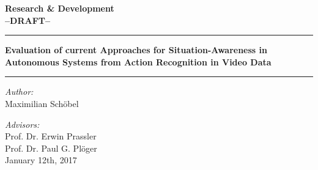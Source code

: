 \documentclass[a4paper, 11pt, listof=totoc, bibliography=totoc]{scrartcl}
\begin{document}
\begin{center}
\LARGE
\textbf{Research \& Development} \\
\textbf{--DRAFT--}

\vspace{2cm}

\rule{\linewidth}{2pt}
\textbf{Evaluation of current Approaches for Situation-Awareness in Autonomous Systems from Action Recognition in Video Data} \\
\rule{\linewidth}{2pt}
\bigskip

\normalsize
\textit{Author:}\\
Maximilian Schöbel
\bigskip

\textit{Advisors:}\\
Prof. Dr. Erwin Prassler\\
Prof. Dr. Paul G. Plöger\\

\vspace{4cm}
January 12th, 2017
\end{center}

\newpage

\footnotesize
\tableofcontents
\normalsize

\newpage







\newpage

\printbibliography
\end{document}

